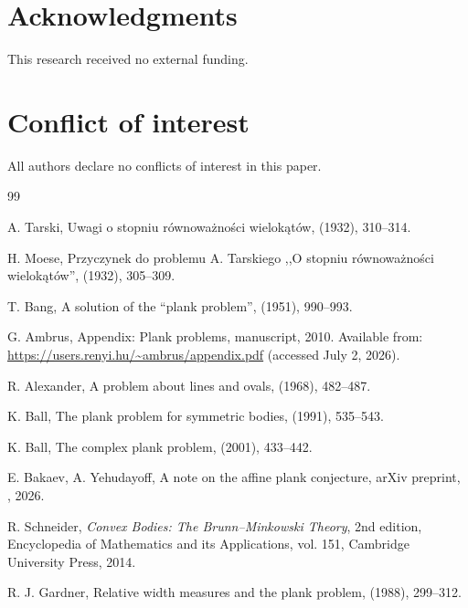 \documentclass{aims}
\numberwithin{equation}{section}
\theoremstyle{plain}
\theoremstyle{definition}
\theoremstyle{remark}
\begin{document}
\section*{Acknowledgments}
This research received no external funding.

\section*{Conflict of interest}
All authors declare no conflicts of interest in this paper.

\begin{thebibliography}{99}

 A. Tarski, {Uwagi o stopniu r\'ownowa\.zno\'sci wielok\k{a}t\'ow},   (1932), 310--314.

 H. Moese, {Przyczynek do problemu A. Tarskiego ,,O stopniu r\'ownowa\.zno\'sci wielok\k{a}t\'ow''},   (1932), 305--309.

 T. Bang, {A solution of the ``plank problem''},   (1951), 990--993. 

 G. Ambrus, {Appendix: Plank problems}, manuscript, 2010. Available from: \url{https://users.renyi.hu/~ambrus/appendix.pdf} (accessed July 2, 2026).

 R. Alexander, {A problem about lines and ovals},   (1968), 482--487. 

 K. Ball, {The plank problem for symmetric bodies},   (1991), 535--543. 

 K. Ball, {The complex plank problem},   (2001), 433--442. 

 E. Bakaev, A. Yehudayoff, {A note on the affine plank conjecture}, arXiv preprint, , 2026.

 R. Schneider, {\em Convex Bodies: The Brunn--Minkowski Theory}, 2nd edition, Encyclopedia of Mathematics and its Applications, vol. 151, Cambridge University Press, 2014. 

 R. J. Gardner, {Relative width measures and the plank problem},   (1988), 299--312. 


\end{thebibliography}
\end{document}
